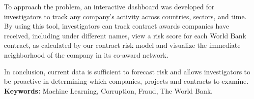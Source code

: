 To approach the problem,  an interactive dashboard was developed for investigators to track any company's activity across countries, sectors, and time. By using this tool, investigators can track contract awards companies have received, including under different names, view a risk score for each World Bank contract, as calculated by our contract risk model and visualize the immediate neighborhood of the company in its co-award network.

In conclusion, current data is sufficient to forecast risk and allows  investigators to be proactive in determining which companies, projects and contracts to examine.
\thispagestyle{plain}
\vfill
\small \noindent \textbf{Keywords:} Machine Learning, Corruption, Fraud, The World Bank.
\normalsize